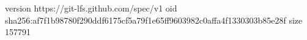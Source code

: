 version https://git-lfs.github.com/spec/v1
oid sha256:af7f1b98780f290ddf6175cf5a79f1e65ff9603982c0affa4f1330303b85e28f
size 157791
